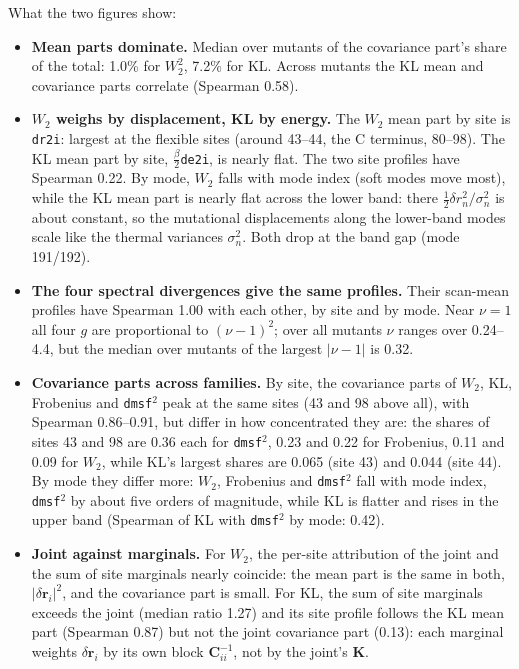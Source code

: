 \documentclass[11pt]{article}
\newcommand{\code}[1]{\texttt{#1}}
\begin{document}
What the two figures show:
\begin{itemize}
\item \textbf{Mean parts dominate.} Median over mutants of the covariance part's share of the total:
  1.0\% for $W_2^2$, 7.2\% for KL. Across mutants the KL mean and covariance parts correlate
  (Spearman 0.58).
\item \textbf{$W_2$ weighs by displacement, KL by energy.} The $W_2$ mean part by site is
  \code{dr2i}: largest at the flexible sites (around 43--44, the C terminus, 80--98). The KL mean part
  by site, $\tfrac\beta2$\code{de2i}, is nearly flat. The two site profiles have Spearman 0.22.
  By mode, $W_2$ falls with mode index (soft modes move most), while the KL mean part is nearly flat
  across the lower band: there $\tfrac12\delta r_n^2/\sigma_n^2$ is about constant, so the mutational
  displacements along the lower-band modes scale like the thermal variances $\sigma_n^2$.
  Both drop at the band gap (mode 191/192).
\item \textbf{The four spectral divergences give the same profiles.} Their scan-mean profiles have
  Spearman 1.00 with each other, by site and by mode. Near $\nu=1$ all four $g$ are proportional to
  $(\nu-1)^2$; over all mutants $\nu$ ranges over 0.24--4.4, but the median over mutants of the largest
  $|\nu-1|$ is 0.32.
\item \textbf{Covariance parts across families.} By site, the covariance parts of $W_2$, KL, Frobenius and
  \code{dmsf}$^2$ peak at the same sites (43 and 98 above all), with Spearman 0.86--0.91, but differ in how
  concentrated they are: the shares of sites 43 and 98 are 0.36 each for \code{dmsf}$^2$, 0.23 and 0.22
  for Frobenius, 0.11 and 0.09 for $W_2$, while KL's largest shares are 0.065 (site 43) and 0.044 (site 44). By mode they differ more: $W_2$, Frobenius and \code{dmsf}$^2$ fall with mode
  index, \code{dmsf}$^2$ by about five orders of magnitude, while KL is flatter and rises in the upper band
  (Spearman of KL with \code{dmsf}$^2$ by mode: 0.42).
\item \textbf{Joint against marginals.} For $W_2$, the per-site attribution of the joint and the sum of
  site marginals nearly coincide: the mean part is the same in both, $|\delta\mathbf{r}_i|^2$, and the
  covariance part is small. For KL, the sum of site marginals exceeds the joint (median ratio 1.27) and
  its site profile follows the KL mean part (Spearman 0.87) but not the joint covariance part (0.13):
  each marginal weights $\delta\mathbf{r}_i$ by its own block $\mathbf{C}_{ii}^{-1}$, not by the joint's
  $\mathbf{K}$.
\end{itemize}
\end{document}
